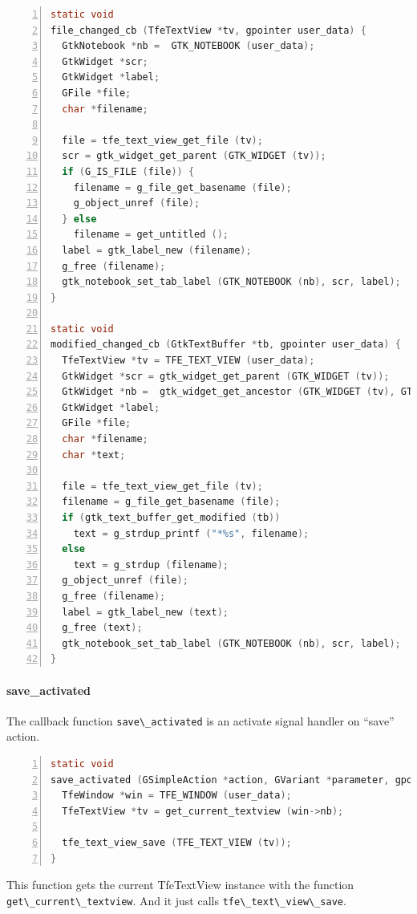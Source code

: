 \begin{lstlisting}[language=C, numbers=left]
static void
file_changed_cb (TfeTextView *tv, gpointer user_data) {
  GtkNotebook *nb =  GTK_NOTEBOOK (user_data);
  GtkWidget *scr;
  GtkWidget *label;
  GFile *file;
  char *filename;

  file = tfe_text_view_get_file (tv);
  scr = gtk_widget_get_parent (GTK_WIDGET (tv));
  if (G_IS_FILE (file)) {
    filename = g_file_get_basename (file);
    g_object_unref (file);
  } else
    filename = get_untitled ();
  label = gtk_label_new (filename);
  g_free (filename);
  gtk_notebook_set_tab_label (GTK_NOTEBOOK (nb), scr, label);
}

static void
modified_changed_cb (GtkTextBuffer *tb, gpointer user_data) {
  TfeTextView *tv = TFE_TEXT_VIEW (user_data);
  GtkWidget *scr = gtk_widget_get_parent (GTK_WIDGET (tv));
  GtkWidget *nb =  gtk_widget_get_ancestor (GTK_WIDGET (tv), GTK_TYPE_NOTEBOOK);
  GtkWidget *label;
  GFile *file;
  char *filename;
  char *text;

  file = tfe_text_view_get_file (tv);
  filename = g_file_get_basename (file);
  if (gtk_text_buffer_get_modified (tb))
    text = g_strdup_printf ("*%s", filename);
  else
    text = g_strdup (filename);
  g_object_unref (file);
  g_free (filename);
  label = gtk_label_new (text);
  g_free (text);
  gtk_notebook_set_tab_label (GTK_NOTEBOOK (nb), scr, label);
}
\end{lstlisting}

\paragraph{save\_activated}\label{save_activated}

The callback function \passthrough{\lstinline!save\_activated!} is an
activate signal handler on ``save'' action.

\begin{lstlisting}[language=C, numbers=left]
static void
save_activated (GSimpleAction *action, GVariant *parameter, gpointer user_data) {
  TfeWindow *win = TFE_WINDOW (user_data);
  TfeTextView *tv = get_current_textview (win->nb);

  tfe_text_view_save (TFE_TEXT_VIEW (tv));
}
\end{lstlisting}

This function gets the current TfeTextView instance with the function
\passthrough{\lstinline!get\_current\_textview!}. And it just calls
\passthrough{\lstinline!tfe\_text\_view\_save!}.


